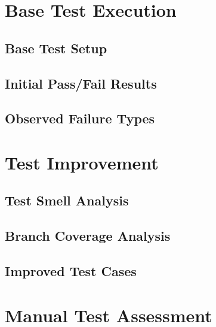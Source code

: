 \documentclass[journal]{IEEEtran}
\begin{document}
\section{Base Test Execution}

\subsection{Base Test Setup}

\subsection{Initial Pass/Fail Results}

\subsection{Observed Failure Types}

\section{Test Improvement}

\subsection{Test Smell Analysis}

\subsection{Branch Coverage Analysis}

\subsection{Improved Test Cases}

\section{Manual Test Assessment}
\end{document}
